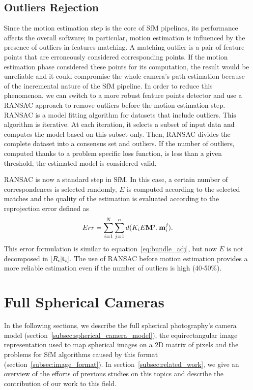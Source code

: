 \subsection{Outliers Rejection}
Since the motion estimation step is the core of SfM pipelines, its performance
affects the overall software; in particular, motion estimation is influenced 
by the presence of outliers in features matching.
A matching outlier is a pair of feature points that are erroneously considered 
corresponding points. If the motion estimation phase considered these points for
its computation, the result would be unreliable and it could compromise the 
whole camera's path estimation because of the incremental nature of the SfM 
pipeline.
In order to reduce this phenomenon, we can switch to a more robust feature points
detector and use a RANSAC approach to remove outliers before the motion estimation step.
RANSAC\cite{fischler1981random} is a model fitting algorithm for datasets that include outliers.
This algorithm is iterative. At each iteration, it selects a subset of input data and computes the model based on this subset only. Then, RANSAC divides the complete dataset into a consensus set and outliers. If the number of outliers, computed thanks to a problem specific loss function, is
less than a given threshold, the estimated model is considered valid.

RANSAC is now a standard step in SfM. In this case, a certain number of correspondences is selected randomly, $E$ is computed 
according to the selected matches and the quality of the estimation is evaluated 
according to the reprojection error defined as
%
\begin{equation*}
	Err =  
	\sum_{i = 1}^N\sum_{j = 1}^n 
	d(K_iE\mathbf{M}^j, \mathbf{m}_i^j) \text{.}
\end{equation*}
%
This error formulation is similar to equation~\ref{eq:bundle_adj}, 
but now $E$ is not decomposed in $[R_i|\mathbf{t}_i]$. The use of RANSAC before motion estimation provides a more reliable 
estimation even if the number of outliers is high (40-50\%).

\section{Full Spherical Cameras}
In the following sections, we describe the full spherical photography's camera
model (section~\ref{subsec:spherical_camera_model}), the equirectangular image 
representation used to map spherical images on a 2D matrix of pixels 
and the problems for SfM algorithms caused by this format 
(section~\ref{subsec:image_format}).
In section~\ref{subsec:related_work}, we give an overview of the efforts of 
previous studies on this topics and describe the contribution of our work to 
this field.

